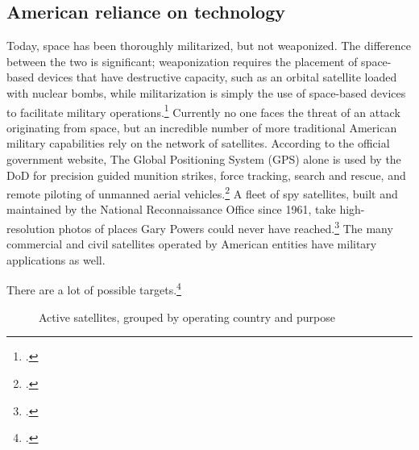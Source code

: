 \documentclass[11pt]{memoir}
\begin{document}
\subsection{American reliance on technology}
Today, space has been thoroughly militarized, but not weaponized. The difference between the two is significant; weaponization requires the placement of space-based devices that have destructive capacity, such as an orbital satellite loaded with nuclear bombs, while militarization is simply the use of space-based devices to facilitate military operations.\footcite[p.~3]{mowthorpe_militarization_2004} Currently no one faces the threat of an attack originating from space, but an incredible number of more traditional American military capabilities rely on the network of satellites. According to the official government website, The Global Positioning System (GPS) alone is used by the DoD for precision guided munition strikes, force tracking, search and rescue, and remote piloting of unmanned aerial vehicles.\footcite{national_coordination_office_for_space-based_positioning_navigation_and_timing_federal_2018} A fleet of spy satellites, built and maintained by the National Reconnaissance Office since 1961, take high-resolution photos of places Gary Powers could never have reached.\footcite{national_reconnaissance_office_about_2019} The many commercial and civil satellites operated by American entities have military applications as well.


There are a lot of possible targets.\footcite[A few satellites are listed as dual-purpose (i.e. Government/Military), and those are counted twice, once for each purpose. For instance, the data shows that the US is currently operating 830 satellites, while adding up the bars in this chart would give you 966. I made this choice to emphasize the dependency of various social systems on the existing satellite infrastructure.]{union_of_concerned_scientists_ucs_2018}


\begin{figure}[ht]
  \centering
  
  \label{country_sats}
  \caption{Active satellites, grouped by operating country and purpose}
\end{figure}
\end{document}
